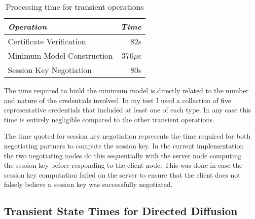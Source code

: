 \begin{table}[tbhp]
  \newcommand\T{\rule{0pt}{2.1ex}}
  \centering
  \caption{Processing time for transient operations}
  {
  \begin{tabular}{|l|r|} \hline
    \textit{Operation} \T & \textit{Time} \\ \hline \hline

    Certificate Verification     \T &  82s \\ \hline 
    Minimum Model Construction   \T & 370$\mu$s \\ \hline
    Session Key Negotiation      \T &  80s\\ \hline
  \end{tabular}
  }
  \label{table-transient-time}
\end{table}

The time required to build the minimum model is directly related to the number and nature of the
credentials involved. In my test I used a collection of five representative credentials that
included at least one of each type. In any case this time is entirely negligible compared to the
other transient operations.


The time quoted for session key negotiation represents the time required for both negotiating
partners to compute the session key. In the current implementation the two negotiating nodes do
this sequentially with the server node computing the session key before responding to the client
node. This was done in case the session key computation failed on the server to ensure that the
client does not falsely believe a session key was successfully negotiated.

\subsection{Transient State Times for Directed Diffusion}

